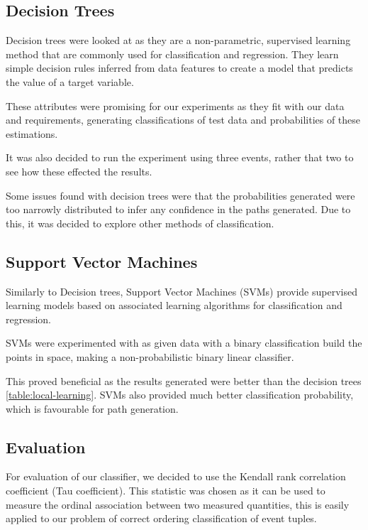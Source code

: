 \documentclass[12pt]{report}
\begin{document}
\subsection{Decision Trees}
Decision trees were looked at as they are a non-parametric, supervised learning method
that are commonly used for classification and regression. They learn simple decision rules inferred from
data features to create a model that predicts the value of a target variable.

These attributes were promising for our experiments as they fit with our data and requirements, generating
classifications of test data and probabilities of these estimations.

It was also decided to run the experiment using three events, rather that two to see how these
effected the results. 

Some issues found with decision trees were that the probabilities generated were too narrowly distributed
to infer any confidence in the paths generated. Due to this, it was decided to explore other methods of
classification.

\subsection{Support Vector Machines}
Similarly to Decision trees, Support Vector Machines (SVMs) provide supervised learning models based on
associated learning algorithms for classification and regression.

SVMs were experimented with as given data with a binary classification build the points in space,
making a non-probabilistic binary linear classifier.

This proved beneficial as the results generated were better than the decision trees \ref{table:local-learning}.
SVMs also provided much better classification probability, which is favourable for path generation.

\subsection{Evaluation}
For evaluation of our classifier, we decided to use the Kendall rank correlation coefficient (Tau coefficient).
This statistic was chosen as it can be used to measure the ordinal association between two measured quantities,
this is easily applied to our problem of correct ordering classification of event tuples.\\ 
\end{document}
